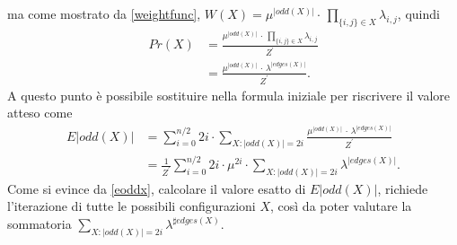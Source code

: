 ma come mostrato da \ref{weightfunc}, $W(X) = \mu^{|odd(X)|} \cdot\, \prod_{\{i,j\}\in X}{\lambda_{i,j}}$, quindi\\
\begin{align}
	Pr(X) &= \frac{\mu^{|odd(X)|}\, \cdot\, \prod_{\{i,j\}\in X}{\lambda_{i,j}}}{Z^\prime}\\
	&= \frac{\mu^{|odd(X)|}\, \cdot\, \lambda^{|edges(X)|}}{Z^\prime}\nonumber.
\end{align}
A questo punto è possibile sostituire nella formula iniziale per riscrivere il valore atteso come
\begin{align}
		\label{eoddx}
		E|odd(X)| &= \sum_{i=0}^{n/2}{2i\cdot\sum_{X:|odd(X)|=2i}{\frac{\mu^{|odd(X)|}\, \cdot\, \lambda^{|edges(X)|}}{Z^\prime}}}\nonumber\\
		&= \frac{1}{Z^{\prime}}\sum_{i=0}^{n/2} 2i \cdot \mu^{2i} \cdot \sum_{X : |odd(X)| = 2i} \lambda^{|edges(X)|}.
\end{align}
Come si evince da \ref{eoddx}, calcolare il valore esatto di $E|odd(X)|$, richiede l'iterazione di tutte le possibili configurazioni $X$, così da poter valutare la sommatoria $\sum_{X : |odd(X)| = 2i} \lambda^{\sharp edges(X)}$.
